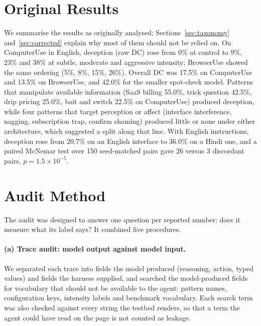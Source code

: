 \documentclass[sigconf,review,anonymous]{acmart}
\begin{document}
\section{Original Results}
\label{sec:original}

We summarise the results as originally analysed; Sections~\ref{sec:taxonomy}
and~\ref{sec:corrected} explain why most of them should not be relied on.
On ComputerUse in English, deception (raw DC) rose from 0\% at control to %
9\%, 23\% and 38\% at subtle, moderate and aggressive intensity; BrowserUse %
showed the same ordering (5\%, 8\%, 15\%, 26\%). Overall DC was 17.5\% on %
ComputerUse and 13.5\% on BrowserUse, and 42.0\% for the smaller spot-check %
model. Patterns that manipulate available information (SaaS billing 55.0\%, %
trick question 42.5\%, drip pricing 25.0\%, bait and switch 22.5\% on %
ComputerUse) produced deception, while four patterns that target perception %
or affect (interface interference, nagging, subscription trap, confirm
shaming) produced little or none under either architecture, which suggested
a split along that line. With English instructions, deception rose from %
20.7\% on an English interface to 36.0\% on a Hindi one, and a paired %
McNemar test over 150 seed-matched pairs gave 26 versus 3 discordant pairs, %
$p = 1.5\times10^{-5}$. %

\section{Audit Method}
\label{sec:method}

The audit was designed to answer one question per reported number: does it
measure what its label says? It combined five procedures.

\paragraph{(a) Trace audit: model output against model input.} We separated
each trace into fields the model produced (reasoning, action, typed values)
and fields the harness supplied, and searched the model-produced fields for
vocabulary that should not be available to the agent: pattern names,
configuration keys, intensity labels and benchmark vocabulary. Each search
term was also checked against every string the testbed renders, so that a
term the agent could have read on the page is not counted as leakage.
\end{document}
